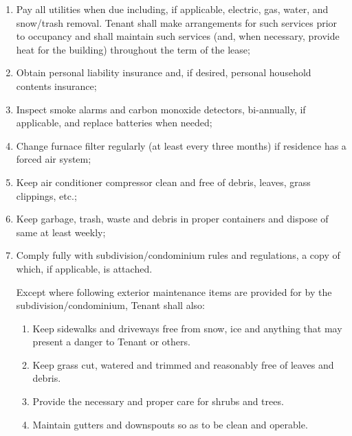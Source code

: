 \documentclass[9pt]{article}
\begin{document}
	\begin{enumerate}[label=\roman*)]
		\item Pay all utilities when due including, if applicable, electric, gas, water, and snow/trash removal. Tenant shall make arrangements for such services prior to occupancy and shall maintain such services (and, when necessary, provide heat for the building) throughout the term of the lease;
		\item Obtain personal liability insurance and, if desired, personal household contents insurance;
		\item Inspect smoke alarms and carbon monoxide detectors, bi-annually, if applicable, and replace batteries when needed;
		\item Change furnace filter regularly (at least every three months) if residence has a forced air system;
		\item Keep air conditioner compressor clean and free of debris, leaves, grass clippings, etc.;
		\item Keep garbage, trash, waste and debris in proper containers and dispose of same at least weekly;  
		\item Comply fully with subdivision/condominium rules and regulations, a copy of which, if applicable, is attached.
		
		Except where following exterior maintenance items are provided for by the subdivision/condominium, Tenant shall also:
		
		\begin{enumerate}
			\item Keep sidewalks and driveways free from snow, ice and anything that may present a danger to Tenant or others.
			\item Keep grass cut, watered and trimmed and reasonably free of leaves and debris.
			\item Provide the necessary and proper care for shrubs and trees.
			\item Maintain gutters and downspouts so as to be clean and operable.
		\end{enumerate}
		

\end{enumerate}
\end{document}
